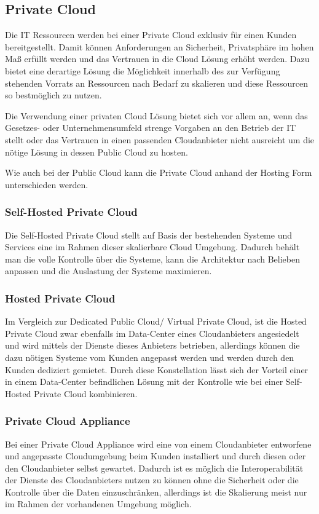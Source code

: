 \subsection{Private Cloud}
Die IT Ressourcen werden bei einer Private Cloud exklusiv für einen Kunden bereitgestellt. Damit können Anforderungen an Sicherheit, Privatsphäre im hohen Maß erfüllt werden und das Vertrauen in die Cloud Lösung erhöht werden. Dazu bietet eine derartige Lösung die Möglichkeit innerhalb des zur Verfügung stehenden Vorrats an Ressourcen nach Bedarf zu skalieren und diese Ressourcen so bestmöglich zu nutzen.

Die Verwendung einer privaten Cloud Lösung bietet sich vor allem an, wenn das Gesetzes- oder Unternehmensumfeld strenge Vorgaben an den Betrieb der IT stellt oder das Vertrauen in einen passenden Cloudanbieter nicht ausreicht um die nötige Lösung in dessen Public Cloud zu hosten. 

Wie auch bei der Public Cloud kann die Private Cloud anhand der Hosting Form unterschieden werden.

\subsubsection{Self-Hosted Private Cloud}
Die Self-Hosted Private Cloud stellt auf Basis der bestehenden Systeme und Services eine im Rahmen dieser skalierbare Cloud Umgebung. Dadurch behält man die volle Kontrolle über die Systeme, kann die Architektur nach Belieben anpassen und die Auslastung der Systeme maximieren.

\subsubsection{Hosted Private Cloud}
Im Vergleich zur Dedicated Public Cloud/ Virtual Private Cloud, ist die Hosted Private Cloud zwar ebenfalls im Data-Center eines Cloudanbieters angesiedelt und wird mittels der Dienste dieses Anbieters betrieben, allerdings können die dazu nötigen Systeme vom Kunden angepasst werden und werden durch den Kunden dediziert gemietet. Durch diese Konstellation lässt sich der Vorteil einer in einem Data-Center befindlichen Lösung mit der Kontrolle wie bei einer Self-Hosted Private Cloud kombinieren.

\subsubsection{Private Cloud Appliance}
Bei einer Private Cloud Appliance wird eine von einem Cloudanbieter entworfene und angepasste Cloudumgebung beim Kunden installiert und durch diesen oder den Cloudanbieter selbst gewartet. Dadurch ist es möglich die Interoperabilität der Dienste des Cloudanbieters nutzen zu können ohne die Sicherheit oder die Kontrolle über die Daten einzuschränken, allerdings ist die Skalierung meist nur im Rahmen der vorhandenen Umgebung möglich.

